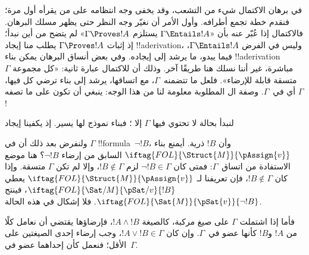 \documentclass[../../../include/open-logic-section]{subfiles}
\begin{document}
      {}
      {}


في برهان الاكتمال شيء من التشعب، وقد يخفى وجه انتظامه على من يقرأه
أول مرة؛ فنقدم خطة تجمع أطرافه. وأول الأمر أن نغيّر وجه النظر حتى
يظهر مسلك البرهان. فالاكتمال إذا عُبّر عنه بأن «$\Gamma \Entails !A$
يستلزم $\Gamma \Proves !A$» لم يتضح من أين نبدأ؛ إذ إثبات
$\Gamma \Proves !A$ يطلب منا إيجاد !!a{derivation}، وليس في الفرض
$\Gamma \Entails !A$، فيما يبدو، ما يرشد إلى إيجاده. وفي بعض أنساق
البرهان يمكن بناء !!a{derivation} مباشرة، غير أننا نسلك هنا طريقًا
آخر. وذلك أن للاكتمال عبارة ثانية: «كل مجموعة $\Gamma$ متسقة قابلة
للإرضاء». فلعل ما تتضمنه~$\Gamma$، مع اتساقها، يرشد إلى بناء
 ترضي كل
 فيها، أي في~$\Gamma$. وصفة
ال المطلوبة معلومة لنا من
هذا الوجه: ينبغي أن تكون على ما تصفه $\Gamma$!{}

لنبدأ بحالة لا تحتوي فيها $\Gamma$ إلا
؛ فبناء
نموذج لها يسير. إذ يكفينا إيجاد

ولنفرض بعد ذلك أن في $\Gamma$ !!{formula}~$\lnot !B$، وأن $!B$
ذرية. أيمنع بناء $\iftag{FOL}{\Struct{M}}{\pAssign{v}}$ السابق من
إرضاء $\lnot !B$؟ هنا موضع الاستفادة من اتساق~$\Gamma$: فمتى كان
$\lnot !B \in \Gamma$ لزم $!B \notin \Gamma$، وإلا لم تكن $\Gamma$
متسقة. وإذا كان $!B \notin \Gamma$، فإن تعريفنا لـ
$\iftag{FOL}{\Struct{M}}{\pAssign{v}}$ يعطي
$\iftag{FOL}{\Sat/{M}}{\pSat/{v}}{!B}$، فينتج
$\iftag{FOL}{\Sat{M}}{\pSat{v}}{\lnot !B}$. فلا إشكال في هذه الحالة.

فأما إذا اشتملت $\Gamma$ على صيغ مركبة، كالصيغة $!A \land !B$،
فإرضاؤها يقتضي أن نعامل كلًا من $!A$ و$!B$ كأنها عضو
في~$\Gamma$. وإن كان $!A \lor !B \in \Gamma$، وجب إرضاء إحدى
الصيغتين على الأقل؛ فنعمل كأن إحداهما عضو في~$\Gamma$.
\end{document}
